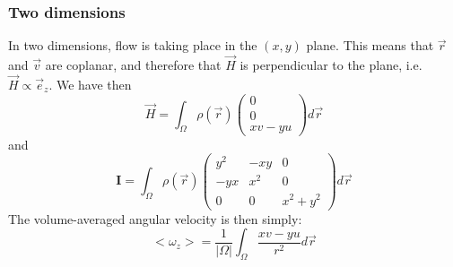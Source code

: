 \subsubsection{Two dimensions}

In two dimensions, flow is taking place in the $(x,y)$ plane. This means that $\vec r$ and $\vec v$ are coplanar, 
and therefore that $\vec H$ is perpendicular to the plane, i.e. $\vec H \propto \vec e_z$.
We have then
\begin{equation}
\vec H = \int_\Omega \rho(\vec r) \left( 
\begin{array}{c} 
0 \\ 0 \\ xv-yu 
\end{array} \right) d\vec r
\end{equation}
and 
\begin{equation}
\bm I=
\int_\Omega \rho(\vec r) 
\left(
\begin{array}{ccc}
y^2 & -xy & 0 \\
-yx & x^2 & 0 \\
0 & 0 & x^2+y^2 
\end{array}
\right)
d\vec r 
\end{equation}
The volume-averaged angular velocity is then simply:
\begin{equation}
<\omega_z> = \frac{1}{|\Omega|}\int_\Omega \frac{xv-yu}{r^2}d\vec r
\end{equation}

















